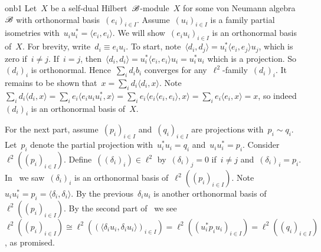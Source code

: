 \begin{solution}{onb1}%
    Let~$X$ be a self-dual Hilbert~$\mathscr{B}$-module~$X$
        for some von Neumann algebra~$\mathscr{B}$
        with orthonormal basis~$(e_i)_{i\in I}$.
Assume~$(u_i)_{i \in I}$ is a family partial isometries
    with~$u_iu_i^* = \langle e_i, e_i \rangle$.
    We will show~$(e_iu_i)_{i \in I}$ is an orthonormal basis
    of~$X$.
For brevity, write~$d_i \equiv e_iu_i$.
To start, note~$\langle d_i, d_j\rangle
            = u_i^* \langle e_i, e_j\rangle u_j$,
            which is zero if~$i \neq j$.
If~$i = j$, then~$\langle d_i, d_i\rangle = u_i^* \langle e_i, e_i\rangle u_i
            = u_i^*u_i $ which is a projection.
    So~$(d_i)_i$ is orthonormal.
Hence~$\sum_i d_i b_i$ converges for any~$\ell^2$-family~$(d_i)_i$.
It remains to be shown that~$x = \sum_i d_i \langle d_i, x\rangle$.
Note~$\sum_i d_i \langle d_i, x\rangle
    =  \sum_i e_i \langle e_i u_i u_i^*, x \rangle
    =  \sum_i e_i \langle e_i \langle e_i, e_i\rangle, x \rangle
    =  \sum_i e_i \langle e_i, x \rangle = x$,
    so indeed~$(d_i)_i$ is an orthonormal basis of~$X$.

For the next part, assume~$(p_i)_{i \in I}$ and~$(q_i)_{i \in I}$
    are projections with~$p_i \sim q_i$.
Let~$p_i$ denote the partial projection with~$u_i^* u_i = q_i$
    and~$u_i u_i^* = p_i$.
Consider~$\ell^2((p_i)_{i \in I})$.
Define~$((\delta_i)_i) \in \ell^2$
    by~$ (\delta_i)_j = 0$ if~$i \neq j$
        and~$(\delta_i)_i = p_i$.
    In~ we saw~$(\delta_i)_i$ is an
        orthonormal basis of~$\ell^2((p_i)_{i \in I})$.
    Note~$u_iu_i^* = p_i = \langle \delta_i, \delta_i\rangle$.
    By the previous~$\delta_i u_i$ is another orthonormal basis of~$
        \ell^2((p_i)_{i \in I})$.
    By the second part of~
        we see~$
        \ell^2((p_i)_{i \in I}) \cong
        \ell^2((\langle \delta_i u_i, \delta_i u_i\rangle)_{i \in I} ) =
        \ell^2((u_i^* p_i u_i  )_{i \in I} ) =
        \ell^2((q_i )_{i \in I} )$,
        as promised.
\end{solution}
